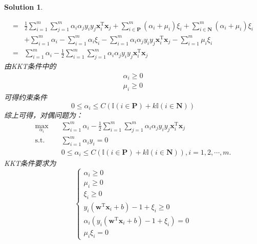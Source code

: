 \documentclass[a4paper,UTF8]{article}
\numberwithin{equation}{section}
\newtheorem*{mySol}{Solution}
\begin{document}
\begin{mySol}
\begin{enumerate}[(1)]
\begin{equation}
\begin{aligned}
=& \frac{1}{2}\sum_{i=1}^{m}\sum_{j=1}^{m}\alpha_i\alpha_jy_iy_j\mathbf{x}_i^\mathrm{T}\mathbf{x}_j + \sum_{i \in \mathbf{P}}^m(\alpha_i + \mu_i)\xi_i + \sum_{i \in \mathbf{N}}^m(\alpha_i + \mu_i)\xi_i\\
& + \sum_{i=1}^{m}\alpha_i - \sum_{i=1}^{m}\alpha_i\xi_i - \sum_{i=1}^{m}\alpha_i\alpha_jy_iy_j\mathbf{x}_i^\mathrm{T}\mathbf{x}_j- \sum_{i=1}^{m}\mu_i\xi_i\\
=& \sum_{i=1}^{m}\alpha_i-\frac{1}{2}\sum_{i=1}^{m}\sum_{j=1}^{m}\alpha_i\alpha_jy_iy_j\mathbf{x}_i^\mathrm{T}\mathbf{x}_j
\end{aligned}
\end{equation}
由KKT条件中的
\begin{equation}
\begin{aligned}
\alpha_i \geq 0\\
\mu_i \geq 0
\end{aligned}
\end{equation}
可得约束条件
\begin{equation}
 0 \leq \alpha_i \leq C(\mathbb{I}(i\in \mathbf{P}) + k\mathbb{I}(i\in \mathbf{N}) )
\end{equation}
综上可得，对偶问题为：
\begin{equation}
\begin{split}
\max_{\alpha_i}& \quad \sum_{i=1}^{m}\alpha_i-\frac{1}{2}\sum_{i=1}^{m}\sum_{j=1}^{m}\alpha_i\alpha_jy_iy_j\mathbf{x}_i^\mathrm{T}\mathbf{x}_j\\
\text{s.t.}&  \quad \sum_{i=1}^{m}\alpha_iy_i = 0\\
& \quad 0 \leq \alpha_i \leq C(\mathbb{I}(i\in \mathbf{P}) + k\mathbb{I}(i\in \mathbf{N}) ), i = 1,2,\cdots,m.
\end{split}	
\end{equation}
KKT条件要求为
\begin{equation}
\begin{cases}
\alpha_i \geq 0\\
\mu_i \geq 0\\
\xi_i \geq 0\\
y_i(\mathbf{w}^\mathrm{T}\mathbf{x}_i + b) - 1 + \xi_i \geq 0\\
\alpha_i(y_i(\mathbf{w}^\mathrm{T}\mathbf{x}_i + b) - 1 + \xi_i) = 0\\
\mu_i\xi_i = 0
\end{cases}
\end{equation}
\end{enumerate}
\end{mySol}
\newpage
\end{document}
